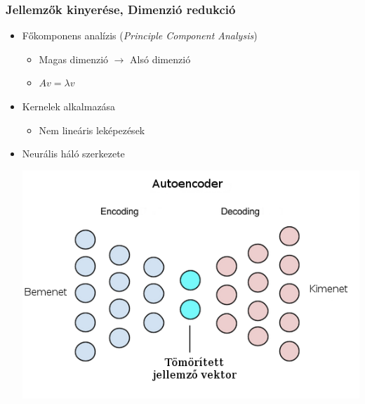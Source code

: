 \documentclass{beamer}
\begin{document}
\begin{frame}[fragile]
\frametitle{Jellemzők kinyerése, Dimenzió redukció}

\begin{itemize}
\item Főkomponens analízis (\textit{Principle Component Analysis})
	\begin{itemize}
		\item Magas dimenzió $\rightarrow$ Alsó dimenzió
		\item \(Av = \lambda v\)
	\end{itemize}
\item Kernelek alkalmazása
	\begin{itemize}
		\item Nem lineáris leképezések
	\end{itemize}
\item Neurális háló szerkezete\\
	\begin{center}
		\includegraphics[scale=0.3]{deep_autoencoder}
	\end{center}
\end{itemize}

\end{frame}
\end{document}
